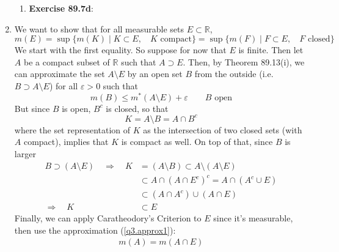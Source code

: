 \documentclass[12pt]{article}
\theoremstyle{plain}
\theoremstyle{definition}
\theoremstyle{remark}
\begin{document}
\begin{enumerate}
\begin{enumerate}
\item \textbf{Exercise 89.7d}:


\end{enumerate}


\item We want to show that for all measurable sets $E\subset \mathbb{R}$, 
\[
    m(E) = \sup \{ m(K) \; | \; K \subset E, \; 
    \text{ $K$ compact}\}  
    = \sup \{ m(F) \; | \; F \subset E, \; 
    \text{ $F$ closed}\}  
\]
We start with the first equality. So suppose for now that $E$ is finite. Then let $A$ be a compact subset of $\mathbb{R}$ such that $A \supset E$. Then, by Theorem 89.13(i), we can approximate the set $A\setminus E$ by an open set $B$ from the outside (i.e. $B\supset A\setminus E$) for all $\varepsilon>0$ such that
\begin{equation}
    \label{q3.approx1}
    m(B) \leq m^*(A\setminus E) + \varepsilon
    \qquad \text{$B$ open}
\end{equation}
But since $B$ is open, $B^c$ is closed, so that 
\[
    K = A \setminus B = A \cap B^c 
\]
where the set representation of $K$ as the intersection of two closed sets (with $A$ compact), implies that $K$ is compact as well. On top of that, since $B$ is larger
\begin{align*}
    B \supset (A\setminus E) 
    \quad \Rightarrow\quad
    K &= (A\setminus B) \subset A\setminus (A\setminus E) \\
    &\subset A\cap (A \cap E^c)^c = A\cap (A^c \cup E)  \\
    &\subset (A \cap A^c) \cup (A\cap E)\\
    \Rightarrow\quad
    K &\subset E
\end{align*}
Finally, we can apply Caratheodory's Criterion to $E$ since it's measurable, then use the approximation (\ref{q3.approx1}):
\begin{align*}
    m(A) = m(A\cap E) 
\end{align*}




\end{enumerate}
\end{document}
